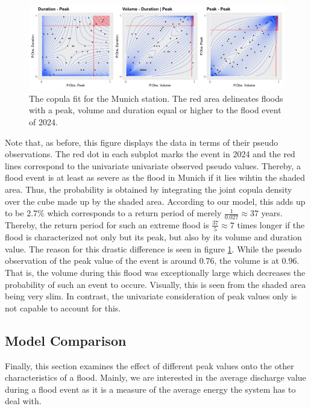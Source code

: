 \documentclass[
]{krantz}
\begin{document}
\begin{figure}

{\centering \includegraphics[width=1\linewidth]{work/04-floodfreq/figures/app_multivariate_hq} 

}

\caption{The copula fit for the Munich station. The red area delineates floods with a peak, volume and duration equal or higher to the flood event of 2024.}\label{fig:probMulti}
\end{figure}

Note that, as before, this figure displays the data in terms of their pseudo observations.
The red dot in each subplot marks the event in 2024 and the red lines correspond to the univariate
univariate observed pseudo values.
Thereby, a flood event is at least as severe as the flood in Munich if it lies wihtin the shaded area.
Thus, the probability is obtained by integrating the joint copula density over the cube made
up by the shaded area.
According to our model, this adds up to be \(2.7\%\) which corresponds to a return period of merely \(\frac{1}{0.027} \approx 37\) years.
Thereby, the return period for such an extreme flood is \(\frac{37}{5}\approx7\) times longer
if the flood is characterized not only but its peak, but also by its volume and duration value.
The reason for this drastic difference is
seen in figure \ref{fig:probMulti}. While the pseudo observation
of the peak value of the event is around \(0.76\),
the volume is at \(0.96\). That is, the volume during this flood was exceptionally large which
decreases the
probability of such an event to occure.
Visually, this is seen from the shaded area being very slim.
In contrast, the univariate consideration of
peak values only
is not capable to account for this.

\subsection{Model Comparison}\label{model-comparison}

Finally, this section examines the effect of different peak values onto the other characteristics of a flood.
Mainly, we are interested in the average discharge value during a flood event as it is a measure
of the average energy the system has to deal with.
\end{document}
